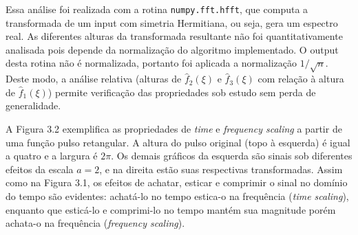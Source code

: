 Essa análise foi realizada com a rotina \texttt{numpy.fft.hfft}, que computa a transformada de um input com simetria Hermitiana, ou seja, gera um espectro real. As diferentes alturas da transformada resultante não foi quantitativamente analisada pois depende da normalização do algoritmo implementado. O output desta rotina não é normalizada, portanto foi aplicada a normalização $1/\sqrt{n}$. Deste modo, a análise relativa (alturas de $\hat{f}_{2}(\xi)$  e $\hat{f}_{3}(\xi)$ com relação à altura de $\hat{f}_{1}(\xi)$) permite verificação das propriedades sob estudo sem perda de generalidade.

\begin{figure}[ht!]
	\vspace{2mm}	%
	\begin{center}
	\end{center}
	\vspace{-2mm}	%
	\label{ex1_fig1}
\end{figure}

A Figura 3.2 exemplifica as propriedades de \textit{time} e \textit{frequency scaling} a partir de uma função pulso retangular. A altura do pulso original (topo à esquerda) é igual a quatro e a largura é $2 \pi$. Os demais gráficos da esquerda são sinais sob diferentes efeitos da escala $a=2$, e na direita estão suas respectivas transformadas. Assim como na Figura 3.1, os efeitos de achatar, esticar e comprimir o sinal no domínio do tempo são evidentes: achatá-lo no tempo estica-o na frequência (\textit{time scaling}), enquanto que esticá-lo e comprimi-lo no tempo mantém sua magnitude porém achata-o na frequência (\textit{frequency scaling}).

